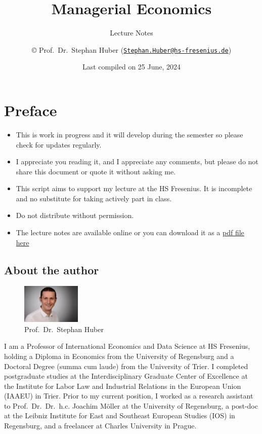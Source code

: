 \documentclass[
  12pt,
  oneside]{book}
\title{Managerial Economics}
\subtitle{Lecture Notes}
\author{© Prof.~Dr.~Stephan Huber (\href{mailto:Stephan.Huber@hs-fresenius.de}{\nolinkurl{Stephan.Huber@hs-fresenius.de}})}
\date{Last compiled on 25 June, 2024}
\providecommand{\tightlist}{%
  \setlength{\itemsep}{0pt}\setlength{\parskip}{0pt}}
\theoremstyle{definition}
\theoremstyle{definition}
\theoremstyle{definition}
\theoremstyle{definition}
\theoremstyle{remark}
\begin{document}
\maketitle

{
\hypersetup{linkcolor=}
\setcounter{tocdepth}{2}
\tableofcontents
}
\chapter*{Preface}\label{preface}

\begin{itemize}
\tightlist
\item
  This is work in progress and it will develop during the semester so please check for updates regularly.
\item
  I appreciate you reading it, and I appreciate any comments, but please do not share this document or quote it without asking me.
\item
  This script aims to support my lecture at the HS Fresenius. It is incomplete and no substitute
  for taking actively part in class.
\item
  Do not distribute without permission.
\item
  The lecture notes are available online or you can download it as a \href{https://raw.githubusercontent.com/hubchev/hubchev.github.io/main/me/_main.pdf}{pdf file here}
\end{itemize}

\section*{About the author}\label{about-the-author}

\begin{figure}
\centering
\includegraphics[width=0.25\textwidth,height=\textheight]{fig/huber2.jpeg}
\caption[\label{fig:itsme} Prof.~Dr.~Stephan Huber]{\label{fig:itsme} Prof.~Dr.~Stephan Huber\footnotemark{}}
\end{figure}

I am a Professor of International Economics and Data Science at HS Fresenius, holding a Diploma in Economics from the University of Regensburg and a Doctoral Degree (summa cum laude) from the University of Trier. I completed postgraduate studies at the Interdisciplinary Graduate Center of Excellence at the Institute for Labor Law and Industrial Relations in the European Union (IAAEU) in Trier. Prior to my current position, I worked as a research assistant to Prof.~Dr.~Dr.~h.c. Joachim Möller at the University of Regensburg, a post-doc at the Leibniz Institute for East and Southeast European Studies (IOS) in Regensburg, and a freelancer at Charles University in Prague.
\end{document}
